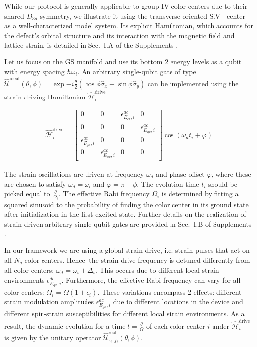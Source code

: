 \documentclass[%
 reprint,
 superscriptaddress,
 amsmath,amssymb,
 aps,
 prx,
]{revtex4-2}
\begin{document}
While our protocol is generally applicable to group-IV color centers due to their shared $D_{3d}$ symmetry, we illustrate it using the transverse-oriented \(\mathrm{SiV}^{-}\) center as a well-characterized model system. Its explicit Hamiltonian, which accounts for the defect's orbital structure and its interaction with the magnetic field and lattice strain, is detailed in Sec.~I.A of the Supplements \cite{googleSI_Programmable_Quantum_Matter_2025Google}.

Let us focus on the GS manifold and use its bottom 2 energy levels as a qubit with energy spacing $\hbar \omega_i$. An arbitrary single-qubit gate of type $\hat{\mathcal{U}}^  {\text{ideal}}(\theta, \phi)=\exp{-i\frac{\theta}{2}(\cos{\phi}\hat{\sigma}_x + \sin{\phi}\hat{\sigma}_y)}$ can be implemented using the strain-driving Hamiltonian $\hat{\mathcal{H}}_i^{\text{drive}}$ \cite{PhysRevB.97.205444}.

\begin{align}
    \hat{\mathcal{H}}_i^{\text{drive}} = 
    \begin{bmatrix}
    0 & 0 & \epsilon_{E_{gx},i}^{ac} & 0 \\
    0 & 0 & 0 & \epsilon_{E_{gx},i}^{ac} \\
    \epsilon_{E_{gx},i}^{ac} & 0 & 0 & 0 \\
    0 & \epsilon_{E_{gx},i}^{ac} & 0 & 0 
  \end{bmatrix}
  \cos(\omega_d t_i + \varphi)
\end{align}

The strain oscillations are driven at frequency $\omega_d$ and phase offset $\varphi$, where these are chosen to satisfy $\omega_d = \omega_i$ and $\varphi=\pi - \phi$. The evolution time $t_i$ should be picked equal to $\frac{\theta}{\Omega_i}$. The effective Rabi frequency $\Omega_i$ is determined by fitting a squared sinusoid to the probability of finding the color center in its ground state after initialization in the first excited state. Further details on the realization of strain-driven arbitrary single-qubit gates are provided in Sec.~I.B of Supplements \cite{googleSI_Programmable_Quantum_Matter_2025Google}.

In our framework we are using a global strain drive, i.e. strain pulses that act on all $N_q$ color centers. Hence, the strain drive frequency is detuned differently from all color centers: $\omega_d = \omega_i + \Delta_i$. This occurs due to different local strain environments $\epsilon_{E_{gx},i}^{dc}$. Furthermore, the effective Rabi frequency can vary for all color centers: $\Omega_i = \Omega (1 + \epsilon_i)$. These variations encompass 2 effects: different strain modulation amplitudes $\epsilon_{E_{gx},i}^{ac}$ due to different locations in the device and different spin-strain susceptibilities for different local strain environments. As a result, the dynamic evolution for a time $t=\frac{\theta}{\Omega}$ of each color center $i$ under $\hat{\mathcal{H}}_i^{\text{drive}}$ is given by the unitary operator $\hat{\mathcal{U}}_{\epsilon_i , f_i}^{\text{real}}(\theta, \phi)$.
\end{document}
